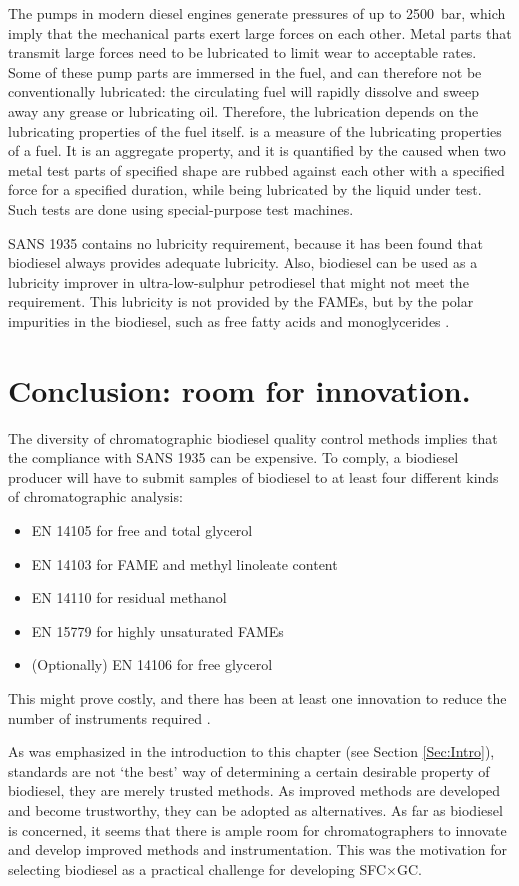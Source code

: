 The pumps in modern diesel engines generate pressures of up to \SI{2500}{\bar},
which imply that the mechanical parts exert large forces on each other.
Metal parts that transmit large forces need to be lubricated to limit wear to
acceptable rates. Some of these pump parts are immersed in the fuel, and can
therefore not be conventionally lubricated: the circulating fuel will rapidly
dissolve and sweep away any grease or lubricating oil. Therefore, the
lubrication depends on the lubricating properties of the fuel itself.
 is a measure of the lubricating properties of a fuel. It is
an aggregate property, and it is quantified by the  caused
when two metal test parts of specified shape are rubbed against each other with
a specified force for a specified duration, while being lubricated by the liquid
under test. Such tests are done using special-purpose test machines.

SANS 1935 contains no lubricity requirement, because it has been found that
biodiesel always provides adequate lubricity. Also, biodiesel can be used as a
lubricity improver in ultra-low-sulphur petrodiesel that might not meet the
requirement. This lubricity is not provided by the FAMEs, but by the polar
impurities in the biodiesel, such as free fatty acids and monoglycerides
\autocite{Knothe2005}.

\section{Conclusion: room for innovation.}

The diversity of chromatographic biodiesel quality control methods implies that the
compliance with SANS 1935 can be expensive. To comply, a biodiesel producer will
have to submit samples of biodiesel to at least four different kinds of
chromatographic analysis:

\begin{itemize}
  \item EN 14105 for free and total glycerol
  \item EN 14103 for FAME and methyl linoleate content
  \item EN 14110 for residual methanol 
  \item EN 15779 for highly unsaturated FAMEs
  \item (Optionally) EN 14106 for free glycerol
\end{itemize}

This might prove costly, and there has been at least one innovation to reduce
the number of instruments required \autocite{McCurry2009}.

As was emphasized in the introduction to this chapter (see Section
\ref{Sec:Intro}), standards are not `the best' way of determining a certain
desirable property of biodiesel, they are merely trusted methods. As improved
methods are developed and become trustworthy, they can be adopted as
alternatives. As far as biodiesel is concerned, it seems that there is ample
room for chromatographers to innovate and develop improved methods and
instrumentation. This was the motivation for selecting biodiesel as a practical
challenge for developing SFC×GC.
